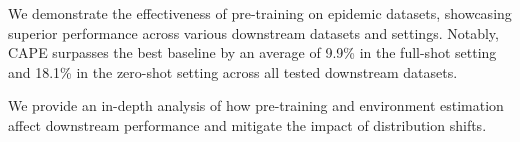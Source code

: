 \begin{compactenum}[\textbullet]
    \item We demonstrate the effectiveness of pre-training on epidemic datasets, showcasing superior performance across various downstream datasets and settings. Notably, CAPE surpasses the best baseline by an average of 9.9\% in the full-shot setting and 18.1\% in the zero-shot setting across all tested downstream datasets.
    

    \item We provide an in-depth analysis of how pre-training and environment estimation affect downstream performance and mitigate the impact of distribution shifts.


    
    
\end{compactenum}

















